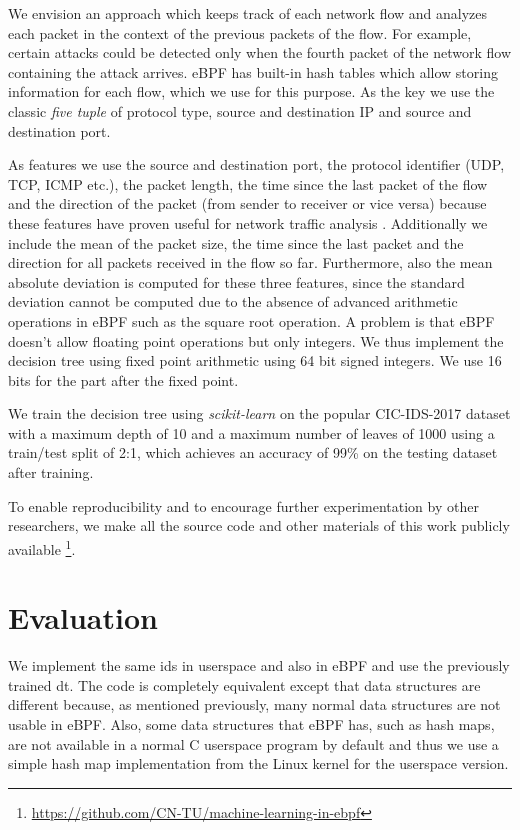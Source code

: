 \documentclass[conference]{IEEEtran}
\begin{document}
We envision an approach which keeps track of each network flow and analyzes each packet in the context of the previous packets of the flow. For example, certain attacks could be detected only when the fourth packet of the network flow containing the attack arrives. eBPF has built-in hash tables which allow storing information for each flow, which we use for this purpose. As the key we use the classic \textit{five tuple} of protocol type, source and destination IP and source and destination port. 


As features we use the source and destination port, the protocol identifier (UDP, TCP, ICMP etc.), the packet length, the time since the last packet of the flow and the direction of the packet (from sender to receiver or vice versa) because these features have proven useful for network traffic analysis \cite{iglesias_ntarc_2020}. Additionally we include the mean of the packet size, the time since the last packet and the direction for all packets received in the flow so far. Furthermore, also the mean absolute deviation is computed for these three features, since the standard deviation cannot be computed due to the absence of advanced arithmetic operations in eBPF such as the square root operation.  A problem is that eBPF doesn't allow floating point operations but only integers. We thus implement the decision tree using fixed point arithmetic using 64 bit signed integers. We use 16 bits for the part after the fixed point.

We train the decision tree using \textit{scikit-learn} on the popular CIC-IDS-2017 dataset \cite{sharafaldin_toward_2018} with a maximum depth of 10 and a maximum number of leaves of 1000 using a train/test split of 2:1, which achieves an accuracy of 99\% on the testing dataset after training. 

To enable reproducibility and to encourage further experimentation by other researchers, we make all the source code and other materials of this work publicly available \footnote{\url{https://github.com/CN-TU/machine-learning-in-ebpf}}.

\section{Evaluation}

We implement the same \gls{ids} in userspace and also in eBPF and use the previously trained \gls{dt}. The code is completely equivalent except that data structures are different because, as mentioned previously, many normal data structures are not usable in eBPF. Also, some data structures that eBPF has, such as hash maps, are not available in a normal C userspace program by default and thus we use a simple hash map implementation from the Linux kernel for the userspace version. 
\end{document}
